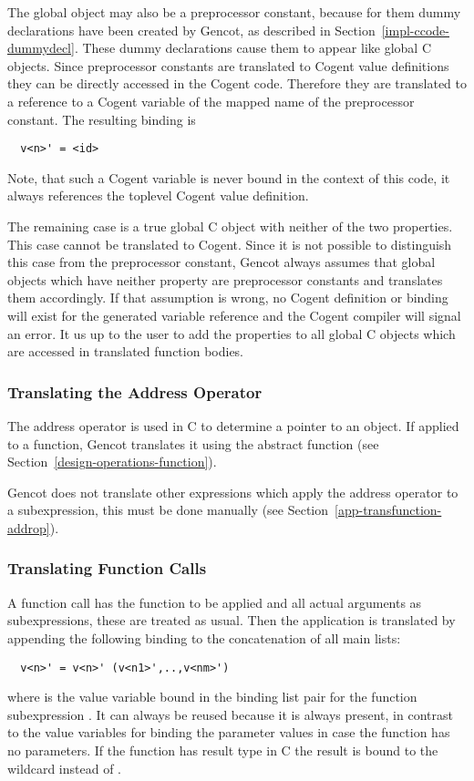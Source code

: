 The global object may also be a preprocessor constant, because for them dummy declarations have been created by Gencot, as
described in Section~\ref{impl-ccode-dummydecl}. These dummy declarations cause them to appear like global C objects. Since
preprocessor constants are translated to Cogent value definitions they can be directly accessed in the Cogent code. Therefore
they are translated to a reference to a Cogent variable of the mapped name of the preprocessor constant. The resulting binding is
\begin{verbatim}
  v<n>' = <id>
\end{verbatim}
Note, that such
a Cogent variable is never bound in the context of this code, it always references the toplevel Cogent value definition.

The remaining case is a true global C object with neither of the two properties. This case cannot be translated to Cogent.
Since it is not possible to distinguish this case from the preprocessor constant, Gencot always assumes that global objects
which have neither property are preprocessor constants and translates them accordingly. If that assumption is wrong, no
Cogent definition or binding will exist for the generated variable reference and the Cogent compiler will signal an error.
It us up to the user to add the properties to all global C objects which are accessed in translated function bodies.

\subsubsection{Translating the Address Operator}

The address operator \code{\&} is used in C to determine a pointer to an object. If applied to a function, Gencot
translates it using the abstract function  (see Section~\ref{design-operations-function}).

Gencot does not translate other expressions which
apply the address operator to a subexpression, this must be done manually (see Section~\ref{app-transfunction-addrop}).

\subsubsection{Translating Function Calls}

A function call  has the function  to be applied and all actual arguments as subexpressions,
these are treated as usual. Then the application is translated by appending the following binding to the concatenation
of all main lists:
\begin{verbatim}
  v<n>' = v<n>' (v<n1>',..,v<nm>')
\end{verbatim}
where  is the value variable bound in the binding list pair for the function subexpression . It can
always be reused because it is always present, in contrast to the value variables for binding the parameter values in case
the function has no parameters. If the function has result type
 in C the result is bound to the wildcard \code{\_} instead of .

